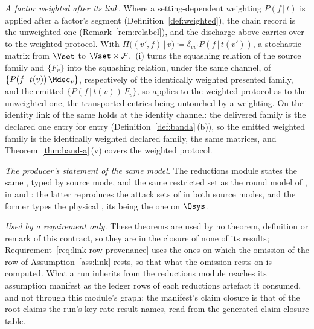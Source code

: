 \begin{remark}
\emph{A factor weighted after its link.} Where a setting-dependent weighting
$P(f\,|\,t)$ is applied after a factor's segment
(Definition~\ref{def:weighted}), the chain record is the unweighted one
(Remark~\ref{rem:relabel}), and the discharge above carries over to the
weighted protocol. With $\Pi\big((v',f)\,|\,v\big)\coloneqq
\delta_{vv'}P(f\,|\,t(v'))$, a stochastic matrix from $\Vset$ to
$\Vset\times\mathcal{F}$, \,(i) turns the
squashing relation of the source family and $\{F_v\}$ into the squashing
relation, under the same channel, of $\{P(f\,|\,t(v))\,\Mdec_v\}$,
respectively of the identically weighted presented family, and the emitted
$\{P(f\,|\,t(v))\,F_v\}$, so
 applies to the weighted protocol as to the
unweighted one, the transported entries being untouched by a weighting. On
the identity link of  the same holds at the identity channel:
the delivered family is the declared one entry for entry
(Definition~\ref{def:banda}\,(b)), so the emitted weighted family is the
identically weighted declared family, the same matrices, and
Theorem~\ref{thm:band-a}\,(v) covers the weighted protocol.

\emph{The producer's statement of the same model.} The reductions module
states the same , typed by source mode, and the same
restricted set as the round model of , in
 and : the latter
reproduces the attack sets of  in both source
modes, and the former types the physical , its  being the one on $\Qsys$.

\emph{Used by a requirement only.} These theorems are used by no theorem,
definition or remark of this contract, so they are in the closure of none of
its results; Requirement~\ref{req:link-row-provenance} uses the ones on which
the omission of the row of Assumption~\ref{ass:link} rests, so that what the
omission rests on is computed. What a run inherits from the reductions module
reaches its assumption manifest as the ledger rows of each reductions artefact
it consumed, and not through this module's graph; the manifest's claim
closure is that of the root claims the run's key-rate result names, read from
the generated claim-closure table.
\end{remark}
